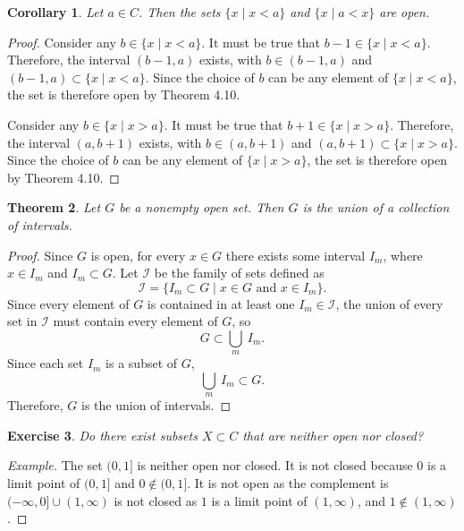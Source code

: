 \documentclass{amsart}
\newtheorem{theorem}{Theorem}
\newtheorem{corollary}[theorem]{Corollary}
\newtheorem{exercise}[theorem]{Exercise}
\newcommand{\1}{\mathds{1}}
\numberwithin{equation}{section}
\numberwithin{theorem}{section}
\begin{document}
\begin{corollary}  Let $a \in C$.  Then the sets $\{ x \mid x < a\}$ and $\{x \mid a < x \}$ are open.
\end{corollary}

\begin{proof}
	Consider any $b\in \{ x \mid x < a\}$. It must be true that $b-1\in \{ x \mid x < a\}$. Therefore, the interval $(b-1,a)$ exists, with $b\in (b-1,a)$ and $(b-1,a)\subset \{ x \mid x < a\}$. Since the choice of $b$ can be any element of $\{ x \mid x < a\}$, the set is therefore open by Theorem 4.10. 
	
	Consider any $b\in \{ x \mid x > a\}$. It must be true that $b+1\in \{ x \mid x > a\}$. Therefore, the interval $(a,b+1)$ exists, with $b\in (a,b+1)$ and $(a,b+1)\subset \{ x \mid x > a\}$. Since the choice of $b$ can be any element of $\{ x \mid x > a\}$, the set is therefore open by Theorem 4.10.
\end{proof}

\begin{theorem}\label{union}  Let $G$ be a nonempty open set.  Then $G$ is the union of a collection of intervals.  
\end{theorem}

\begin{proof}
	Since $G$ is open, for every $x\in G$ there exists some interval $I_m$, where $x\in I_m$ and $I_m\subset G$. Let $\mathcal{I}$ be the family of sets defined as $$\mathcal{I} = \{I_m \subset G\mid x\in G \text{ and } x\in I_m\}.$$ Since every element of $G$ is contained in at least one $I_m\in \mathcal{I}$, the union of every set in $\mathcal{I}$ must contain every element of $G$, so $$G\subset \bigcup_m \ I_m.$$ Since each set $I_m$ is a subset of $G$, $$\bigcup_m \ I_m \subset G.$$ Therefore, $G$ is the union of intervals. 
\end{proof}


\begin{exercise}  Do there exist subsets $X \subset C$ that are neither open nor closed?
\end{exercise}

\begin{proof}[Example]
	The set $(0,1]$ is neither open nor closed. It is not closed because $0$ is a limit point of $(0,1]$ and $0\notin (0,1]$. It is not open as the complement is $(-\infty,0] \cup (1,\infty)$ is not closed as $1$ is a limit point of $(1,\infty)$, and $1\notin (1,\infty)$.
\end{proof}
\end{document}
